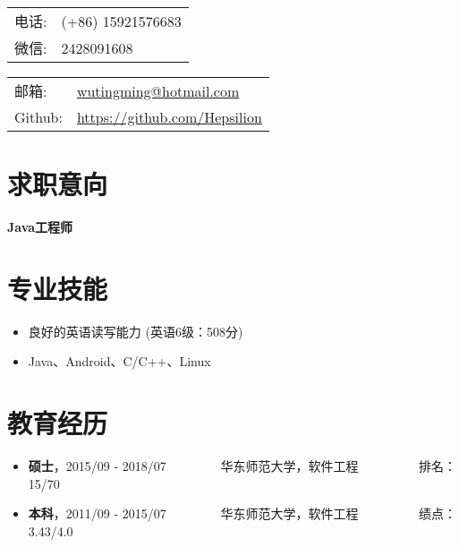\documentclass[letterpaper, UTF8, 11pt]{article}
\def\name{\textbf{\textcolor[rgb]{0.00, 0.00, 0.00}{\fontsize{30pt}{30pt}吴庭明}} ~~~~~~~~~ \fontsize{15pt}{15pt}}
\begin{document}
	
	\noindent{\bf \name} 
	\vspace{0.1in}

	\begin{minipage}{0.45\linewidth}
		\begin{tabular}{ll}
			电话:   & (+86) 15921576683 \\
			微信:   & 2428091608 \\
		\end{tabular}
	\end{minipage}
	\begin{minipage}{0.45\linewidth}
		\begin{tabular}{ll}
			邮箱:   & \href{mailto:wutingming@hotmail.com}{ wutingming@hotmail.com} \\
			Github: & \href{https://github.com/Hepsilion}{https://github.com/Hepsilion}\\
		\end{tabular}
	\end{minipage}
	\vspace{-0.1in}
	
	\section*{\textbf{求职意向}}\vspace{-0.15in}
		\textbf{Java工程师}
	\vspace{-0.25in}
	
	\section*{\textbf{专业技能}}\vspace{-0.15in}
	\begin{itemize}
		\item 良好的英语读写能力 (英语6级：508分)
		\item Java、Android、C/C++、Linux%
	\end{itemize}
	\vspace{-0.3in}
	
	\section*{\textbf{教育经历}}\vspace{-0.15in}
	\begin{itemize}
		\item \textbf{硕士}，2015/09 - 2018/07 ~~~~~~~~华东师范大学，软件工程  ~~~~~~~~~排名：15/70
		\item \textbf{本科}，2011/09 - 2015/07 ~~~~~~~~华东师范大学，软件工程  ~~~~~~~~~绩点：3.43/4.0
	\end{itemize}
	\vspace{-0.3in}
	
\end{document}
